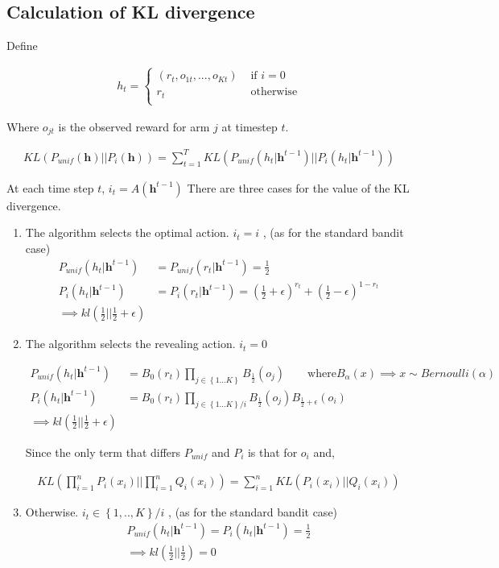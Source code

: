\documentclass{article}
\newcommand{\set}[1]{\left\{#1\right\}}
\newcommand{\eqn}[1]{\begin{align}#1\end{align}}
\renewcommand{\Pi}[1]{P_i\left( #1 \right)}
\newcommand{\Pu}[1]{P_{unif}\left( #1 \right)}
\newcommand{\kl}[2]{KL\left(#1 || #2 \right)}
\theoremstyle{plain}
\theoremstyle{definition}
\begin{document}
\subsection{Calculation of KL divergence}

Define 

\eqn{
h_t = 
\begin{cases}
(r_t,o_{1t},...,o_{Kt}) & \text{ if } i = 0 \\
r_t & \text{ otherwise}\\
\end{cases}
}

Where $o_{jt}$ is the observed reward for arm $j$ at timestep $t$.

\eqn {
\kl{\Pu{\boldsymbol{h}} }{\Pi{\boldsymbol{h}}} = 
\sum_{t=1}^T \kl{\Pu{h_t|\boldsymbol h^{t-1}}}{\Pi{h_t|\boldsymbol h^{t-1}}}
}

At each time step $t$, $i_t = A(\boldsymbol h^{t-1})$ There are three cases for the value of the KL divergence. 

\begin{enumerate}
\item The algorithm selects the optimal action. $i_t = i$ , (as for the standard bandit case)
\eqn{
\Pu{h_t|\boldsymbol h^{t-1}} &= \Pu{r_t|\boldsymbol h^{t-1}} = \frac{1}{2} \\
\Pi{h_t|\boldsymbol h^{t-1}} &= \Pi{r_t|\boldsymbol h^{t-1}} = 
(\frac{1}{2}+\epsilon)^{r_t}+(\frac{1}{2}-\epsilon)^{1-r_t} \\
\implies kl(\frac{1}{2} || \frac{1}{2} + \epsilon)
}

\item The algorithm selects the revealing action. $i_t = 0$

\eqn {
\Pu{h_t|\boldsymbol h^{t-1}} &= B_0(r_t)\prod_{j \in \set{1...K}} B_{\frac{1}{2}}(o_j) \qquad \text{where} B_\alpha(x) \implies x \sim Bernoulli(\alpha) \\
\Pi{h_t|\boldsymbol h^{t-1}} &= B_0(r_t) \prod_{j \in \set{1...K}/i} B_{\frac{1}{2}}(o_j)B_{\frac{1}{2}+\epsilon}(o_i) \\
\implies kl(\frac{1}{2} || \frac{1}{2} + \epsilon)
}

Since the only term that differs $P_{unif}$ and $P_i$ is that for $o_i$ and,

\eqn{
\kl{\prod_{i=1}^nP_i(x_i)}{\prod_{i=1}^n Q_i(x_i)} = \sum_{i=1}^n \kl{P_i(x_i)}{Q_i(x_i)}
}


\item Otherwise. $i_t \in \set{1,..,K}/i$ , (as for the standard bandit case)
\eqn {
\Pu{h_t|\boldsymbol h^{t-1}} = \Pi{h_t|\boldsymbol h^{t-1}} = \frac{1}{2}\\
\implies kl(\frac{1}{2} ||\frac{1}{2}) = 0
}
\end{enumerate}
\end{document}
